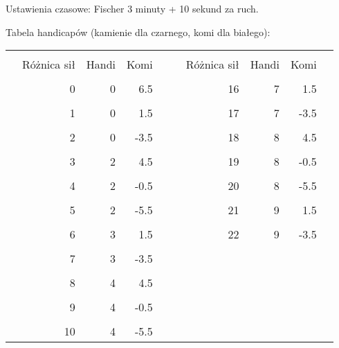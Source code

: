 



\vfil

Ustawienia czasowe: Fischer 3 minuty + 10 sekund za ruch.

\vfil

Tabela handicapów (kamienie dla czarnego, komi dla białego):

\vfil

\begin{tabularx}{\textwidth}{| X r r r X | X r r r X |}
\hline
&&&&&&&&& \\[-1.1em] & Różnica sił & Handi & Komi & & & Różnica sił & Handi & Komi & \\[.2em] \hline
&&&&&&&&& \\[-1.1em] &           0 &     0 &  6.5 & & &          16 &     7 &  1.5 & \\[.2em] \hline
&&&&&&&&& \\[-1.1em] &           1 &     0 &  1.5 & & &          17 &     7 & -3.5 & \\[.2em] \hline
&&&&&&&&& \\[-1.1em] &           2 &     0 & -3.5 & & &          18 &     8 &  4.5 & \\[.2em] \hline
&&&&&&&&& \\[-1.1em] &           3 &     2 &  4.5 & & &          19 &     8 & -0.5 & \\[.2em] \hline
&&&&&&&&& \\[-1.1em] &           4 &     2 & -0.5 & & &          20 &     8 & -5.5 & \\[.2em] \hline
&&&&&&&&& \\[-1.1em] &           5 &     2 & -5.5 & & &          21 &     9 &  1.5 & \\[.2em] \hline
&&&&&&&&& \\[-1.1em] &           6 &     3 &  1.5 & & &          22 &     9 & -3.5 & \\[.2em] \hline
&&&&&&&&& \\[-1.1em] &           7 &     3 & -3.5 & & &             &       &      & \\[.2em] \hline
&&&&&&&&& \\[-1.1em] &           8 &     4 &  4.5 & & &             &       &      & \\[.2em] \hline
&&&&&&&&& \\[-1.1em] &           9 &     4 & -0.5 & & &             &       &      & \\[.2em] \hline
&&&&&&&&& \\[-1.1em] &          10 &     4 & -5.5 & & &             &       &      & \\[.2em] \hline

\end{tabularx}
